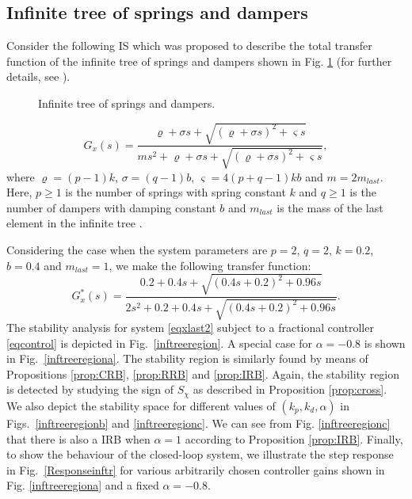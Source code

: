 \documentclass[twoside,reqno,11pt]{fcaa-var} %
\begin{document}
\subsection{Infinite tree of springs and dampers}
Consider the following IS which was proposed to describe the total transfer function of the infinite tree of springs and dampers shown in Fig. \ref{figinftree} (for further details, see \cite{Goodwine2018,Guel-Cortez2018b}).
\begin{figure}[]
	\centering
	\begin{adjustbox}{max width=\columnwidth}
		
	\end{adjustbox}
	\caption{Infinite tree of springs and dampers.}\label{figinftree}
\end{figure}
\begin{equation}
G_x(s)\!\!=\!\!\frac{\varrho+\sigma s+ \sqrt{(\varrho+\sigma s)^2+\varsigma s}}{ms^2+\varrho+\sigma s+\sqrt{(\varrho+\sigma s)^2+\varsigma s}}, \label{eqxlast2}
\end{equation} 
where $\varrho=(p-1)k$, $\sigma=(q-1)b$, $\varsigma=4(p+q-1)kb$ and $m=2m_{last}$. Here, $p\geq1$ is the number of springs with spring constant $k$ and $q\geq1$ is the number of dampers with damping constant $b$ and $m_{last}$ is the mass of the last element in the infinite tree \cite{Goodwine2018}. \par
Considering the case when the system parameters are $p=2$, $q=2$, $k=0.2$, $b=0.4$ and $m_{last}=1$, we make the following transfer function:
\begin{equation}
G_x^*(s)=\frac{0.2+0.4 s+\sqrt{(0.4 s+0.2)^2+0.96 s}}{2 s^2+0.2+0.4 s+\sqrt{(0.4 s+0.2)^2+0.96 s}}.
\end{equation}
The stability analysis for system \eqref{eqxlast2} subject to a fractional controller \eqref{eqcontrol} is depicted in Fig.~\ref{inftreeregion}. A special case for $\alpha=-0.8$ is shown in Fig.~\ref{inftreeregiona}. The stability region is similarly found by means of Propositions \ref{prop:CRB}, \ref{prop:RRB} and \ref{prop:IRB}. Again, the stability region is detected by studying the sign of $S_{\chi}$ as described in Proposition \ref{prop:cross}. We also depict the  stability space for different values of $(k_p,k_d,\alpha)$ in Figs.~\ref{inftreeregionb} and \ref{inftreeregionc}. We can see from Fig. \ref{inftreeregionc} that there is also a IRB when $\alpha=1$ according to Proposition \ref{prop:IRB}. Finally, to show the behaviour of the closed-loop system, we illustrate the step response in Fig.~\ref{Responseinftr} for various arbitrarily chosen controller gains shown in Fig. \ref{inftreeregiona} and a fixed $\alpha=-0.8$.
\end{document}
